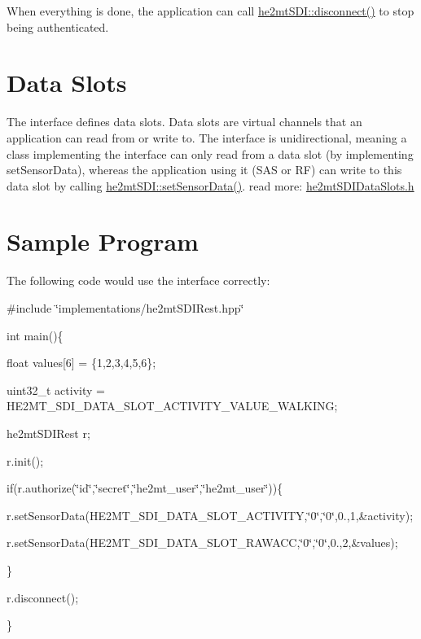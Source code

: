 When everything is done, the application can call \hyperlink{classhe2mt_s_d_i_a7f9d573e91544cc1436dab6bf1a889cf}{he2mt\-S\-D\-I\-::disconnect()} to stop being authenticated.\hypertarget{index_secSlots}{}\section{Data Slots}\label{index_secSlots}
The interface defines data slots. Data slots are virtual channels that an application can read from or write to. The interface is unidirectional, meaning a class implementing the interface can only read from a data slot (by implementing set\-Sensor\-Data), whereas the application using it (S\-A\-S or R\-F) can write to this data slot by calling \hyperlink{classhe2mt_s_d_i_a775fcd2c08e923050b76aa750895a983}{he2mt\-S\-D\-I\-::set\-Sensor\-Data()}. read more\-: \hyperlink{he2mt_s_d_i_data_slots_8h}{he2mt\-S\-D\-I\-Data\-Slots.\-h} \hypertarget{index_secSample}{}\section{Sample Program}\label{index_secSample}
The following code would use the interface correctly\-:

\#include \char`\"{}implementations/he2mt\-S\-D\-I\-Rest.\-hpp\char`\"{} \par
 int main()\{\par
 float values\mbox{[}6\mbox{]} = \{1,2,3,4,5,6\};\par
 uint32\-\_\-t activity = H\-E2\-M\-T\-\_\-\-S\-D\-I\-\_\-\-D\-A\-T\-A\-\_\-\-S\-L\-O\-T\-\_\-\-A\-C\-T\-I\-V\-I\-T\-Y\-\_\-\-V\-A\-L\-U\-E\-\_\-\-W\-A\-L\-K\-I\-N\-G;\par
 he2mt\-S\-D\-I\-Rest r;\par
 r.\-init();\par
 if(r.\-authorize(\char`\"{}id\char`\"{},\char`\"{}secret\char`\"{},\char`\"{}he2mt\-\_\-user\char`\"{},\char`\"{}he2mt\-\_\-user\char`\"{}))\{\par
 r.\-set\-Sensor\-Data(H\-E2\-M\-T\-\_\-\-S\-D\-I\-\_\-\-D\-A\-T\-A\-\_\-\-S\-L\-O\-T\-\_\-\-A\-C\-T\-I\-V\-I\-T\-Y,\char`\"{}0\char`\"{},\char`\"{}0\char`\"{},0.,1,\&activity);\par
 r.\-set\-Sensor\-Data(H\-E2\-M\-T\-\_\-\-S\-D\-I\-\_\-\-D\-A\-T\-A\-\_\-\-S\-L\-O\-T\-\_\-\-R\-A\-W\-A\-C\-C,\char`\"{}0\char`\"{},\char`\"{}0\char`\"{},0.,2,\&values);\par
 \}\par
 r.\-disconnect();\par
 \}\par
 
